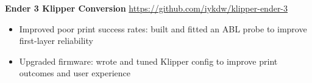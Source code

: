 \textbf{Ender 3 Klipper Conversion} \hfill \href{http://github.com/iykdw/klipper-ender-3}{https://github.com/iykdw/klipper-ender-3} \\
\vspace{-6pt}
\begin{itemize}
	\item Improved poor print success rates: built and fitted an ABL probe to improve first-layer reliability
	\item Upgraded firmware: wrote and tuned Klipper config to improve print outcomes and user experience
\end{itemize}
